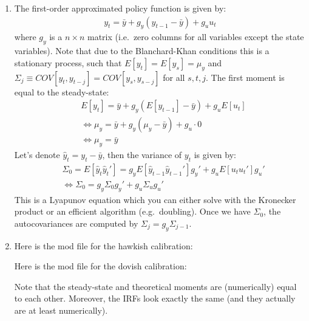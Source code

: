 \begin{enumerate}
\item The first-order approximated policy function is given by:
\begin{align*}
    y_t = \bar{y} + g_y (y_{t-1} - \bar{y}) + g_u u_t
\end{align*}
where $g_y$ is a $n \times n$ matrix (i.e.\ zero columns for all variables except the state variables).
Note that due to the Blanchard-Khan conditions this is a stationary process,
  such that $E[y_t] = E[y_s] = \mu_y$ and $\Sigma_{j} \equiv COV[y_t,y_{t-j}] = COV[y_{s}, y_{s-j}]$ for all $s,t,j$.
The first moment is equal to the steady-state:
\begin{align*}
&E [y_t] = \bar{y} + g_y (E [y_{t-1}] - \bar{y}) + g_u E [u_t]
\\
&\Leftrightarrow \mu_y = \bar{y} + g_y(\mu_y - \bar{y}) + g_u \cdot 0
\\
&\Leftrightarrow \mu_y = \bar{y}
\end{align*}
Let's denote $\hat{y}_t = y_t - \bar{y}$, then the variance of $y_t$ is given by:
\begin{align*}
&\Sigma_0 = E[\hat{y}_t \hat{y}_t'] = g_y E[\hat{y}_{t-1} \hat{y}_{t-1}'] g_y' + g_u E[u_t u_t'] g_u'
\\
&\Leftrightarrow \Sigma_0 = g_y \Sigma_0 g_y' + g_u \Sigma_u g_u'
\end{align*}
This is a Lyapunov equation which you can either solve with the Kronecker product or an efficient algorithm (e.g.\ doubling).
Once we have $\Sigma_0$, the autocovariances are computed by $\Sigma_j = g_y \Sigma_{j-1}$.

\item Here is the mod file for the hawkish calibration:


Here is the mod file for the dovish calibration:


Note that the steady-state and theoretical moments are (numerically) equal to each other.
Moreover, the IRFs look exactly the same (and they actually are at least numerically).
\end{enumerate}